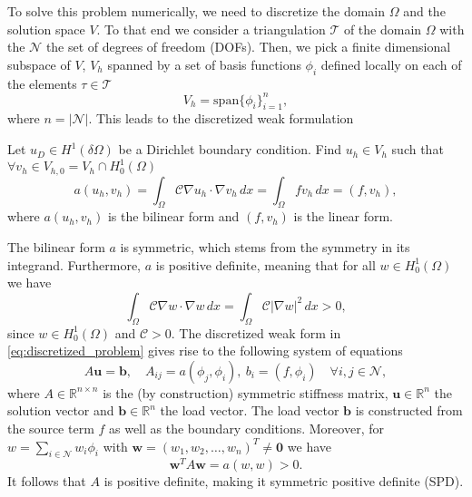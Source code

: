 To solve this problem numerically, we need to discretize the domain $\Omega$ and the solution space $V$. To that end we consider a triangulation $\mathcal{T}$ of the domain $\Omega$ with the $\mathcal{N}$ the set of degrees of freedom (DOFs). Then, we pick a finite dimensional subspace of $V$, $V_h$ spanned by a set of basis functions $\phi_i$ defined locally on each of the elements $\tau \in \mathcal{T}$
\begin{equation*}
  V_h = \text{span}\{\phi_i\}_{i=1}^{n},
\end{equation*}
where $n = |\mathcal{N}|$. This leads to the discretized weak formulation
\begin{problem}
    Let $u_D\in H^1(\delta\Omega)$ be a Dirichlet boundary condition. Find $u_h\in V_h$ such that $\forall v_h \in V_{h,0} = V_h\cap H^1_0(\Omega)$
    \begin{equation}
        a(u_h, v_h) = \int_\Omega \mathcal{C}\nabla u_h\cdot\nabla v_h\,dx = \int_\Omega f v_h \,dx = (f, v_h),
        \label{eq:discretized_problem}
    \end{equation}
    where $a(u_h, v_h)$ is the bilinear form and $(f, v_h)$ is the linear form.
    \label{pr:elliptic_problem_discretized}
\end{problem}
The bilinear form $a$ is symmetric, which stems from the symmetry in its integrand. Furthermore, $a$ is positive definite, meaning that for all $w\in H^1_0(\Omega)$ we have
\begin{equation*}
  \int_\Omega \mathcal{C} \nabla w\cdot\nabla w\,dx = \int_\Omega \mathcal{C} |\nabla w|^2\,dx > 0,
\end{equation*}
since $w\in H^1_0(\Omega)$ and $\mathcal{C}>0$. The discretized weak form in \cref{eq:discretized_problem} gives rise to the following system of equations
\begin{equation}
    A\mathbf{u} = \mathbf{b}, \quad A_{ij} = a(\phi_j, \phi_i), \ b_i = (f, \phi_i) \quad \forall i,j\in\mathcal{N},
\end{equation}
where $A\in\mathbb{R}^{n \times n}$ is the (by construction) symmetric stiffness matrix, $\mathbf{u}\in\mathbb{R}^{n}$ the solution vector and $\mathbf{b}\in\mathbb{R}^{n}$ the load vector. The load vector $\mathbf{b}$ is constructed from the source term $f$ as well as the boundary conditions. Moreover, for $w = \sum_{i\in\mathcal{N}} w_i \phi_i$ with $\mathbf{w} = (w_1, w_2, \ldots, w_n)^T \neq \mathbf{0}$ we have
\begin{equation*}
    \mathbf{w}^T A \mathbf{w} = a(w,w) > 0.
\end{equation*}
It follows that $A$ is positive definite, making it symmetric positive definite (SPD).

